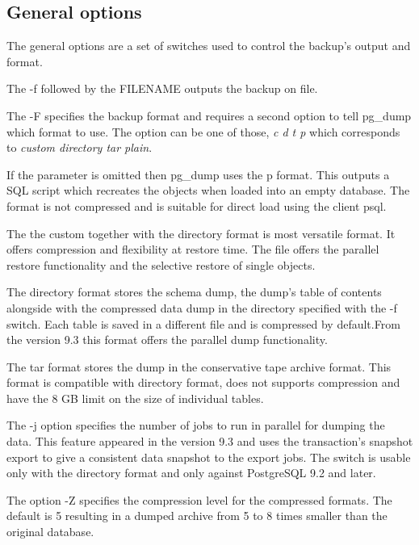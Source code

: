 \subsection{General options}
The general options are a set of switches used to control the backup's output and format. 

The -f followed by the FILENAME outputs the backup on file.\newline

The -F specifies the backup format and requires a second option to tell pg\_dump which format to 
use. The option can be one of those, \textit{c d t p} which corresponds to 
\textit{custom directory tar plain}.\newline

If the parameter is omitted then pg\_dump uses the p format. This outputs a SQL script which 
recreates the objects when loaded into an empty database. The format is not compressed and is 
suitable for direct load using the client psql. 

The the custom together with the directory format  is most versatile format. It offers compression 
and flexibility at restore time. The file offers the parallel restore functionality and the 
selective restore of single objects.\newline

The directory format stores the schema dump, the dump's table of contents alongside with the 
compressed data dump in the directory specified with the -f switch. Each table is saved in a 
different file and is compressed by default.From the version 9.3 this format offers the parallel 
dump functionality.\newline

The tar format stores the dump in the conservative tape archive format. This format is compatible 
with directory format, does not supports compression and have the 8 GB limit on the size of 
individual tables.\newline

The -j option specifies the number of jobs to run in parallel for dumping the data. This feature 
appeared in the version 9.3 and uses the transaction's snapshot export to give a consistent data 
snapshot to the export jobs. The switch is usable only with the directory format and only 
against PostgreSQL 9.2 and later.\newline 

The option -Z specifies the compression level for the compressed formats. The default is 5 
resulting in a dumped archive from 5 to 8 times smaller than the original database. 

